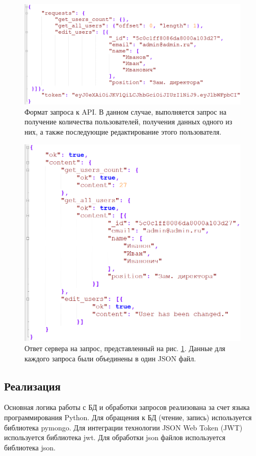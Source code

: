 \begin{figure}[h]
    \centering
    \includegraphics[width=1\linewidth]{img/req.png}
    \caption{Формат запроса к API. В данном случае, выполняется запрос на получение количества пользователей, получения данных одного из них, а также последующие редактирование этого пользователя.}
    \label{fig:req}
\end{figure}

\begin{figure}[h]
    \centering
    \includegraphics[width=1\linewidth]{img/ans.png}
    \caption{Ответ сервера на запрос, представленный на рис. \ref{fig:req}. Данные для каждого запроса были объединены в один JSON файл.}
    \label{fig:ans}
\end{figure}


\clearpage
\subsection{Реализация}
Основная логика работы с БД и обработки запросов реализована за счет языка программирования Python. Для обращения к БД (чтение, запись) используется библиотека pymongo. Для интеграции технологии JSON Web Token (JWT) используется библиотека jwt. Для обработки json файлов используется библиотека json.

